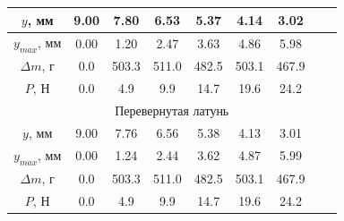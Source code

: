 \documentclass[12pt]{article}
\begin{document}
\begin{enumerate}
\begin{table}[H]
\begin{tabular}{|ccccccccc|}
            \multicolumn{1}{|c|}{$y$, мм}       & \multicolumn{1}{c|}{9.00} & \multicolumn{1}{c|}{7.80}  & \multicolumn{1}{c|}{6.53}  & \multicolumn{1}{c|}{5.37}  & \multicolumn{1}{c|}{4.14}  & \multicolumn{1}{c|}{3.02}  & \multicolumn{1}{c|}{}      &       \\ \hline
            \multicolumn{1}{|c|}{$y_{max}$, мм} & \multicolumn{1}{c|}{0.00} & \multicolumn{1}{c|}{1.20}  & \multicolumn{1}{c|}{2.47}  & \multicolumn{1}{c|}{3.63}  & \multicolumn{1}{c|}{4.86}  & \multicolumn{1}{c|}{5.98}  & \multicolumn{1}{c|}{}      &       \\ \hline
            \multicolumn{1}{|c|}{$\Delta m$, г} & \multicolumn{1}{c|}{0.0}  & \multicolumn{1}{c|}{503.3} & \multicolumn{1}{c|}{511.0} & \multicolumn{1}{c|}{482.5} & \multicolumn{1}{c|}{503.1} & \multicolumn{1}{c|}{467.9} & \multicolumn{1}{c|}{}      &       \\ \hline
            \multicolumn{1}{|c|}{$P$, Н}        & \multicolumn{1}{c|}{0.0}  & \multicolumn{1}{c|}{4.9}   & \multicolumn{1}{c|}{9.9}   & \multicolumn{1}{c|}{14.7}  & \multicolumn{1}{c|}{19.6}  & \multicolumn{1}{c|}{24.2}  & \multicolumn{1}{c|}{}      &       \\ \hline
            \multicolumn{9}{|c|}{Перевернутая латунь}                                                                                                                                                                                                             \\ \hline
            \multicolumn{1}{|c|}{$y$, мм}       & \multicolumn{1}{c|}{9.00} & \multicolumn{1}{c|}{7.76}  & \multicolumn{1}{c|}{6.56}  & \multicolumn{1}{c|}{5.38}  & \multicolumn{1}{c|}{4.13}  & \multicolumn{1}{c|}{3.01}  & \multicolumn{1}{c|}{}      &       \\ \hline
            \multicolumn{1}{|c|}{$y_{max}$, мм} & \multicolumn{1}{c|}{0.00} & \multicolumn{1}{c|}{1.24}  & \multicolumn{1}{c|}{2.44}  & \multicolumn{1}{c|}{3.62}  & \multicolumn{1}{c|}{4.87}  & \multicolumn{1}{c|}{5.99}  & \multicolumn{1}{c|}{}      &       \\ \hline
            \multicolumn{1}{|c|}{$\Delta m$, г} & \multicolumn{1}{c|}{0.0}  & \multicolumn{1}{c|}{503.3} & \multicolumn{1}{c|}{511.0} & \multicolumn{1}{c|}{482.5} & \multicolumn{1}{c|}{503.1} & \multicolumn{1}{c|}{467.9} & \multicolumn{1}{c|}{}      &       \\ \hline
            \multicolumn{1}{|c|}{$P$, Н}        & \multicolumn{1}{c|}{0.0}  & \multicolumn{1}{c|}{4.9}   & \multicolumn{1}{c|}{9.9}   & \multicolumn{1}{c|}{14.7}  & \multicolumn{1}{c|}{19.6}  & \multicolumn{1}{c|}{24.2}  & \multicolumn{1}{c|}{}      &       \\ \hline
            \end{tabular}
        \end{table}


\end{enumerate}
\end{document}
